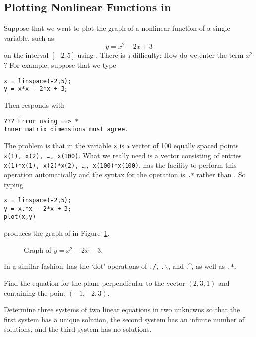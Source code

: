 \subsection*{Plotting Nonlinear Functions in \Matlab}

Suppose that we want to plot the graph of a nonlinear function of
a single variable, such as
\begin{equation}  \label{E:quadex}
y = x^2 - 2x + 3
\end{equation}
on the interval $[-2,5]$ using \Matlabp.  There is a difficulty:  How
do we enter the term $x^2$?  For example, suppose that we type
\begin{verbatim}
x = linspace(-2,5);
y = x*x - 2*x + 3;
\end{verbatim}
Then \Matlab responds with
\begin{verbatim}
??? Error using ==> *
Inner matrix dimensions must agree.
\end{verbatim}
The problem is that in \Matlab the variable {\tt x} is a vector of
100 equally spaced points {\tt x(1), x(2), \ldots, x(100)}.  What we
really need is a vector consisting of entries {\tt x(1)*x(1), x(2)*x(2),
\ldots, x(100)*x(100)}.  \Matlab has the facility to perform this
operation automatically and the syntax for the operation is {\tt .*}
rather than {\tt *}.  So typing
\begin{verbatim}
x = linspace(-2,5);
y = x.*x - 2*x + 3;
plot(x,y)
\end{verbatim}
produces the graph of  in Figure~\ref{F:quadex}.
\begin{figure}[htb]
              \centerline{%
              }
              \caption{Graph of $y = x^2 - 2x + 3$.}
              \label{F:quadex}
\end{figure}
In a similar fashion, \Matlab has the `dot' operations of
{\tt ./},
{\tt .$\backslash$}, and  .\^{}, as well
as {\tt .*}.

\EXER



\TEXER

\begin{exercise} \label{c2.2.5}
Find the equation for the plane perpendicular to the vector $(2,3,1)$
and containing the point $(-1,-2,3)$.
\end{exercise}

\begin{exercise} \label{c2.2.6}
Determine three systems of two linear equations in two unknowns
so that the first system has a unique solution, the second
system has an infinite number of solutions, and the third system
has no solutions.
\end{exercise}

